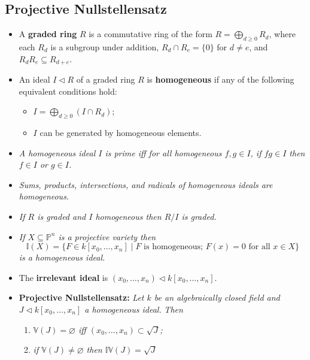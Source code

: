 \documentclass[10pt]{article}
\newcommand{\van}{\mathbb{V}}
\newcommand{\ide}{\mathbb{I}}
\newcommand{\kzn}{{k[x_0,\ldots,x_n]}}
\newcommand{\pee}{\mathbb{P}}
\begin{document}
        \subsection{Projective Nullstellensatz}

            \begin{itemize}
                \item A \textbf{graded ring} $R$ is a commutative ring of the form $R=\bigoplus_{d\geqslant0}R_d$, where each $R_d$ is a subgroup under addition, $R_d\cap R_e=\{0\}$ for $d\neq e$, and $R_dR_e\subseteq R_{d+e}$.
                \item An ideal $I\triangleleft R$ of a graded ring $R$ is \textbf{homogeneous} if any of the following equivalent conditions hold:
                \begin{itemize}
                    \item $I=\bigoplus_{d\geqslant0}(I\cap R_d)$;
                    \item $I$ can be generated by homogeneous elements.
                \end{itemize}
                \item \emph{A homogeneous ideal $I$ is prime iff for all \emph{homogeneous} $f,g\in I$, if $fg\in I$ then $f\in I$ or $g\in I$.}
                \item \emph{Sums, products, intersections, and radicals of homogeneous ideals are homogeneous.}
                \item \emph{If $R$ is graded and $I$ homogeneous then $R/I$ is graded.}
                \item \emph{If $X\subseteq\pee^n$ is a projective variety then}
                    \begin{equation*}
                        \ide(X)=\{F\in\kzn\mid F\text{ is homogeneous; }F(x)=0\text{ for all }x\in X\}
                    \end{equation*}
                    \emph{is a homogeneous ideal.}
                \item The \textbf{irrelevant ideal} is $(x_0,\ldots,x_n)\triangleleft\kzn$.
                \item \textbf{Projective Nullstellensatz:} \emph{Let $k$ be an algebraically closed field and $J\triangleleft\kzn$ a homogeneous ideal.}
                    \emph{Then}
                    \begin{enumerate}
                        \item \emph{$\van(J)=\varnothing$ iff $(x_0,\ldots,x_n)\subset\sqrt{J}$;}
                        \item \emph{if $\van(J)\neq\varnothing$ then $\ide\van(J)=\sqrt{J}$}
                    \end{enumerate}


\end{itemize}
\end{document}
